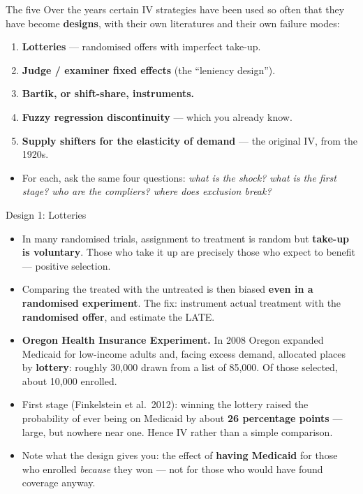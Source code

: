 \documentclass[
  11pt,
  ignorenonframetext,
  aspectratio=169,
]{beamer}
\providecommand{\tightlist}{%
  \setlength{\itemsep}{0pt}\setlength{\parskip}{0pt}}
\begin{document}
\begin{frame}{The five}
\protect{}\label{the-five}
Over the years certain IV strategies have been used so often that they
have become \textbf{designs}, with their own literatures and their own
failure modes:

\vspace{0.3em}

\begin{enumerate}
\tightlist
\item
  \textbf{Lotteries} --- randomised offers with imperfect take-up.
\item
  \textbf{Judge / examiner fixed effects} (the ``leniency design'').
\item
  \textbf{Bartik, or shift-share, instruments.}
\item
  \textbf{Fuzzy regression discontinuity} --- which you already know.
\item
  \textbf{Supply shifters for the elasticity of demand} --- the original
  IV, from the 1920s.
\end{enumerate}

\vspace{0.5em}

\begin{itemize}
\tightlist
\item
  For each, ask the same four questions: \emph{what is the shock? what
  is the first stage? who are the compliers? where does exclusion
  break?}
\end{itemize}
\end{frame}

\begin{frame}{Design 1: Lotteries}
\protect{}\label{design-1-lotteries}
\begin{itemize}
\tightlist
\item
  In many randomised trials, assignment to treatment is random but
  \textbf{take-up is voluntary}. Those who take it up are precisely
  those who expect to benefit --- positive selection.
\item
  Comparing the treated with the untreated is then biased \textbf{even
  in a randomised experiment}. The fix: instrument actual treatment with
  the \textbf{randomised offer}, and estimate the LATE.
\item
  \textbf{Oregon Health Insurance Experiment.} In 2008 Oregon expanded
  Medicaid for low-income adults and, facing excess demand, allocated
  places by \textbf{lottery}: roughly 30,000 drawn from a list of
  85,000. Of those selected, about 10,000 enrolled.
\item
  First stage (Finkelstein et al.~2012): winning the lottery raised the
  probability of ever being on Medicaid by about \textbf{26 percentage
  points} --- large, but nowhere near one. Hence IV rather than a simple
  comparison.
\item
  Note what the design gives you: the effect of \textbf{having Medicaid}
  for those who enrolled \emph{because} they won --- not for those who
  would have found coverage anyway.
\end{itemize}
\end{frame}
\end{document}
